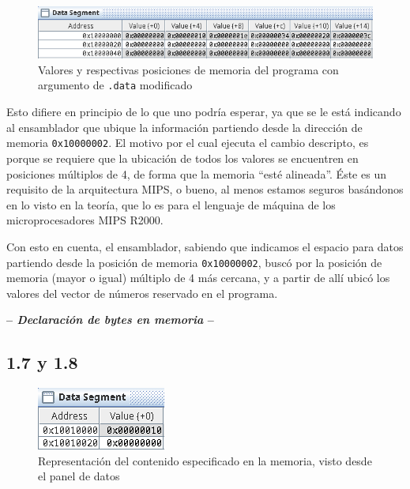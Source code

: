 \documentclass[a4paper]{report}
\begin{document}
\begin{figure}[h]
    \centering
    \captionsetup{justification = centering}
    \includegraphics[width=.8\linewidth]{img/c1-6}
    \caption{Valores y respectivas posiciones de memoria del programa con argumento de \texttt{.data} modificado}
    \label{fig:not-multiple}
\end{figure}

Esto difiere en principio de lo que uno podría esperar, ya que se le está indicando al ensamblador que ubique la información partiendo desde la dirección de memoria \texttt{0x10000002}. El motivo por el cual ejecuta el cambio descripto, es porque se requiere que la ubicación de todos los valores se encuentren en posiciones múltiplos de 4, de forma que la memoria ``esté alineada''. Éste es un requisito de la arquitectura MIPS, o bueno, al menos estamos seguros basándonos en lo visto en la teoría, que lo es para el lenguaje de máquina de los microprocesadores MIPS R2000.

Con esto en cuenta, el ensamblador, sabiendo que indicamos el espacio para datos partiendo desde la posición de memoria \texttt{0x10000002}, buscó por la posición de memoria (mayor o igual) múltiplo de 4 más cercana, y a partir de allí ubicó los valores del vector de números reservado en el programa.

\begin{center}
\large\textbf{-- \textsl{Declaración de bytes en memoria} --}
\end{center}

\subsection*{1.7 y 1.8}

\begin{figure}
    \centering
    \captionsetup{justification = centering}
    \includegraphics[width=\linewidth]{img/c1-7}
    \caption{Representación del contenido especificado en la memoria, visto desde el panel de datos}
    \label{fig:c1-7}
\end{figure}
\end{document}
